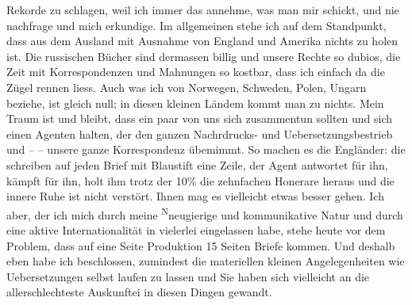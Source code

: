           Rekorde zu schlagen, weil ich immer das annehme, was man mir schickt, und nie nachfrage
          und mich erkundige. Im allgemeinen stehe ich auf dem Standpunkt, dass aus dem Ausland mit
          Ausnahme von England und Amerika nichts zu holen ist. Die russischen Bücher sind dermassen billig und unsere Rechte so dubios, die Zeit mit
          Korrespondenzen und Mahnungen \label{T_L03688-1v}\label{T_L03688-1} so kostbar, dass ich einfach da die Zügel rennen
          liess. Auch was ich von Norwegen, Schweden, Polen, Ungarn beziehe, ist gleich null; in diesen kleinen
          Ländem kommt man zu nichts. Mein Traum ist und bleibt, dass ein paar von uns sich
          zusammentun sollten und sich einen Agenten halten, der den ganzen Nachrdrucks- und
          Uebersetzungsbestrieb und – \label{K_L03688-2v}\label{K_L03688-2} – unsere ganze
          Korrespondenz übemimmt. So machen es die Engländer:
          die schreiben auf jeden Brief mit Blaustift eine Zeile, der Agent antwortet für ihn, kämpft für ihn, holt ihm trotz der 10{\%} die zehnfachen Honerare heraus und die innere Ruhe ist nicht
          verstört. Ihnen mag es vielleicht etwas besser gehen. Ich aber, der ich mich durch meine \substVorne{}\textsuperscript{N}\substDazwischen{}n\substHinten{}eugierige und kommunikative Natur und durch eine aktive Internationalität {\pb}in vielerlei eingelassen habe, stehe heute vor
          dem Problem, dass auf eine Seite Produktion 15 Seiten Briefe kommen. Und deshalb eben habe
          ich beschlossen, zumindest die materiellen kleinen Angelegenheiten wie Uebersetzungen
          selbst laufen zu lassen und Sie haben sich vielleicht an die allerschlechteste Auskunftei
          in diesen Dingen gewandt.\pend
           
